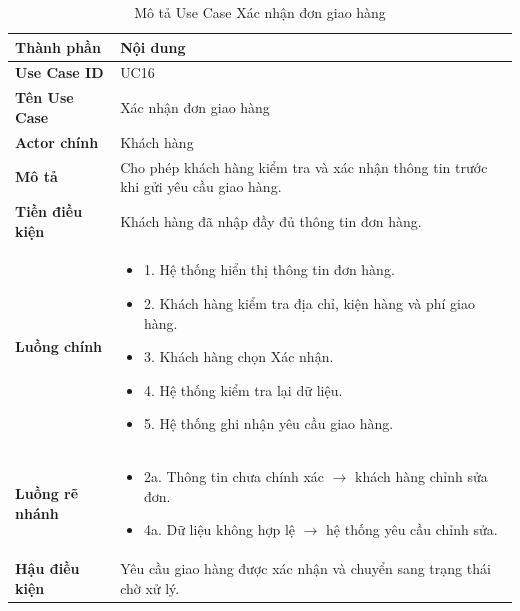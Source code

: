 \begin{longtable}{|L{3cm}|L{11cm}|}
\caption{Mô tả Use Case Xác nhận đơn giao hàng}
\label{tab:mo-ta-uc16-xac-nhan-don}
\\
\hline
\textbf{Thành phần} & \textbf{Nội dung} \\
\hline
\textbf{Use Case ID} & UC16 \\
\hline
\textbf{Tên Use Case} & Xác nhận đơn giao hàng \\
\hline
\textbf{Actor chính} & Khách hàng \\
\hline
\textbf{Mô tả} & Cho phép khách hàng kiểm tra và xác nhận thông tin trước khi gửi yêu cầu giao hàng. \\
\hline
\textbf{Tiền điều kiện} & Khách hàng đã nhập đầy đủ thông tin đơn hàng. \\
\hline
\textbf{Luồng chính} & \begin{itemize}[leftmargin=*,topsep=2pt,itemsep=2pt]
\item 1. Hệ thống hiển thị thông tin đơn hàng.
\item 2. Khách hàng kiểm tra địa chỉ, kiện hàng và phí giao hàng.
\item 3. Khách hàng chọn Xác nhận.
\item 4. Hệ thống kiểm tra lại dữ liệu.
\item 5. Hệ thống ghi nhận yêu cầu giao hàng.
\end{itemize} \\
\hline
\textbf{Luồng rẽ nhánh} & \begin{itemize}[leftmargin=*,topsep=2pt,itemsep=2pt]
\item 2a. Thông tin chưa chính xác $\rightarrow$ khách hàng chỉnh sửa đơn.
\item 4a. Dữ liệu không hợp lệ $\rightarrow$ hệ thống yêu cầu chỉnh sửa.
\end{itemize} \\
\hline
\textbf{Hậu điều kiện} & Yêu cầu giao hàng được xác nhận và chuyển sang trạng thái chờ xử lý. \\
\hline
\end{longtable}

